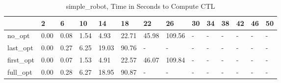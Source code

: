\begin{table}
\caption{simple_robot, Time in Seconds to Compute CTL}
\label{simple_robot_CTL_time}
\begin{tabular}{llllllllllllll}
\toprule
 & 2 & 6 & 10 & 14 & 18 & 22 & 26 & 30 & 34 & 38 & 42 & 46 & 50 \\
\midrule
no_opt & 0.00 & 0.08 & 1.54 & 4.93 & 22.71 & 45.98 & 109.56 & - & - & - & - & - & - \\
last_opt & 0.00 & 0.27 & 6.25 & 19.03 & 90.76 & - & - & - & - & - & - & - & - \\
first_opt & 0.00 & 0.07 & 1.53 & 4.91 & 22.57 & 46.07 & 109.84 & - & - & - & - & - & - \\
full_opt & 0.00 & 0.28 & 6.27 & 18.95 & 90.87 & - & - & - & - & - & - & - & - \\
\bottomrule
\end{tabular}
\end{table}
